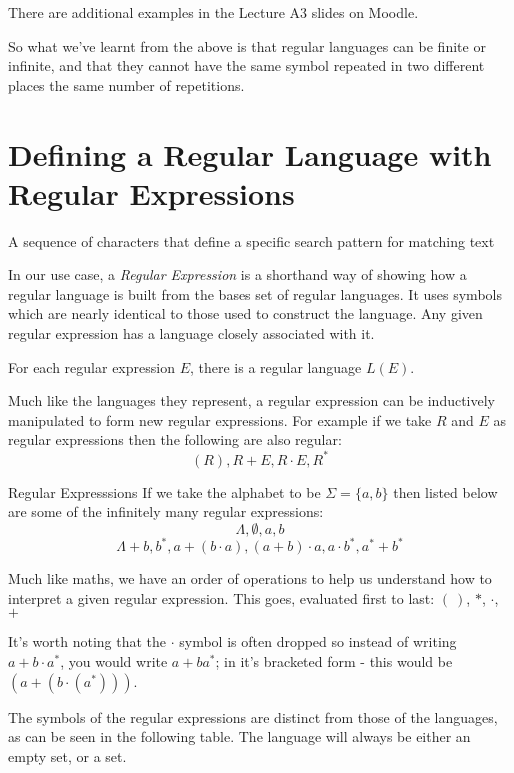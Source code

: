 \begin{extlink}
There are additional examples in the Lecture A3 slides on Moodle.
\end{extlink}

So what we've learnt from the above is that regular languages can be finite or infinite, and that they cannot have the same symbol repeated in two different places the same number of repetitions.

\section{Defining a Regular Language with Regular Expressions}
\begin{define}
    \item[Regular Expression] A sequence of characters that define a specific search pattern for matching text
\end{define}

In our use case, a \textit{Regular Expression} is a shorthand way of showing how a regular language is built from the bases set of regular languages. It uses symbols which are nearly identical to those used to construct the language. Any given regular expression has a language closely associated with it.

For each regular expression $E$, there is a regular language $L(E)$. 

Much like the languages they represent, a regular expression can be inductively manipulated to form new regular expressions. For example if we take $R$ and $E$ as regular expressions then the following are also regular:
\[(R), R + E, R \cdot E, R^*\]

\begin{example}{Regular Expresssions}
If we take the alphabet to be $\Sigma = \{a, b\}$ then listed below are some of the infinitely many regular expressions:
\[\Lambda, \emptyset, a, b\]
\[\Lambda + b, b^*, a+(b \cdot a), (a + b) \cdot a, a \cdot b^*, a^* + b^*\]
\end{example}

Much like maths, we have an order of operations to help us understand how to interpret a given regular expression. This goes, evaluated first to last: $(\ )$, $*$, $\cdot$, $+$

It's worth noting that the $\cdot$ symbol is often dropped so instead of writing $a + b \cdot a^*$, you would write $a+ba^*$; in it's bracketed form - this would be $(a+(b \cdot (a^*)))$. 

The symbols of the regular expressions are distinct from those of the languages, as can be seen in the following table. The language will always be either an empty set, or a set. 


